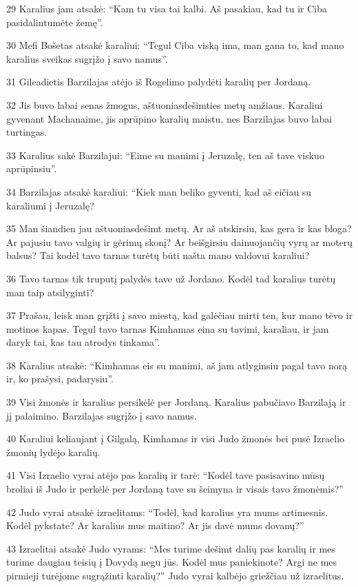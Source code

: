 \par 29 Karalius jam atsakė: “Kam tu visa tai kalbi. Aš pasakiau, kad tu ir Ciba pasidalintumėte žemę”. 
\par 30 Mefi Bošetas atsakė karaliui: “Tegul Ciba viską ima, man gana to, kad mano karalius sveikas sugrįžo į savo namus”. 
\par 31 Gileadietis Barzilajas atėjo iš Rogelimo palydėti karalių per Jordaną. 
\par 32 Jis buvo labai senas žmogus, aštuoniasdešimties metų amžiaus. Karaliui gyvenant Machanaime, jis aprūpino karalių maistu, nes Barzilajas buvo labai turtingas. 
\par 33 Karalius sakė Barzilajui: “Eime su manimi į Jeruzalę, ten aš tave viskuo aprūpinsiu”. 
\par 34 Barzilajas atsakė karaliui: “Kiek man beliko gyventi, kad aš eičiau su karaliumi į Jeruzalę? 
\par 35 Man šiandien jau aštuoniasdešimt metų. Ar aš atskirsiu, kas gera ir kas bloga? Ar pajusiu tavo valgių ir gėrimų skonį? Ar beišgirsiu dainuojančių vyrų ar moterų balsus? Tai kodėl tavo tarnas turėtų būti našta mano valdovui karaliui? 
\par 36 Tavo tarnas tik truputį palydės tave už Jordano. Kodėl tad karalius turėtų man taip atsilyginti? 
\par 37 Prašau, leisk man grįžti į savo miestą, kad galėčiau mirti ten, kur mano tėvo ir motinos kapas. Tegul tavo tarnas Kimhamas eina su tavimi, karaliau, ir jam daryk tai, kas tau atrodys tinkama”. 
\par 38 Karalius atsakė: “Kimhamas eis su manimi, aš jam atlyginsiu pagal tavo norą ir, ko prašysi, padarysiu”. 
\par 39 Visi žmonės ir karalius persikėlė per Jordaną. Karalius pabučiavo Barzilają ir jį palaimino. Barzilajas sugrįžo į savo namus. 
\par 40 Karaliui keliaujant į Gilgalą, Kimhamas ir visi Judo žmonės bei pusė Izraelio žmonių lydėjo karalių. 
\par 41 Visi Izraelio vyrai atėjo pas karalių ir tarė: “Kodėl tave pasisavino mūsų broliai iš Judo ir perkėlė per Jordaną tave su šeimyna ir visais tavo žmonėmis?” 
\par 42 Judo vyrai atsakė izraelitams: “Todėl, kad karalius yra mums artimesnis. Kodėl pykstate? Ar karalius mus maitino? Ar jis davė mums dovanų?” 
\par 43 Izraelitai atsakė Judo vyrams: “Mes turime dešimt dalių pas karalių ir mes turime daugiau teisių į Dovydą negu jūs. Kodėl mus paniekinote? Argi ne mes pirmieji turėjome sugrąžinti karalių?” Judo vyrai kalbėjo griežčiau už izraelitus.



